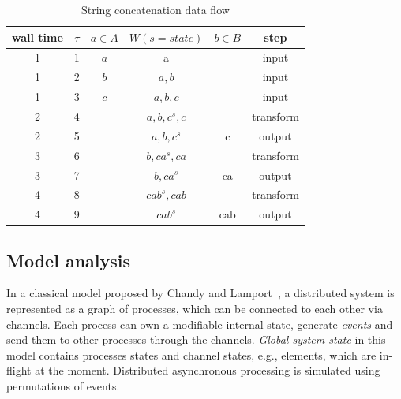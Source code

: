 
\begin{table}[htbp]
\caption{String concatenation data flow}
\begin{tabular}{cccccc}
wall time & $\tau$ & $a\in A$ & $W (s=state)$ & $b \in B$ & step  \\
\hline
1 & 1 & $a$ & a & & input    \\
1 & 2 & $b$ & $a,b$ &  & input      \\
1 & 3 & $c$ & $a,b,c$ &  & input     \\
2 & 4 &  & $a,b,c^{s},c$ &  & transform     \\
2 & 5 &  & $a,b,c^{s}$ & c  & output     \\
3 & 6 &  & $b,ca^{s},ca$ &   & transform     \\
3 & 7 &  & $b,ca^{s}$ & ca  & output     \\
4 & 8 &  & $cab^{s},cab$ &   & transform     \\
4 & 9 &  & $cab^{s}$ & cab  & output     \\
\end{tabular}
\label{concat_example}
\end{table}

\subsection{Model analysis}

In a classical model proposed by Chandy and Lamport~\cite{Chandy:1985:DSD:214451.214456}, a distributed system is represented as a graph of processes, which can be connected to each other via channels. Each process can own a modifiable internal state, generate {\em events} and send them to other processes through the channels. {\em Global system state} in this model contains processes states and channel states, e.g., elements, which are in-flight at the moment. Distributed asynchronous processing is simulated using permutations of events.

